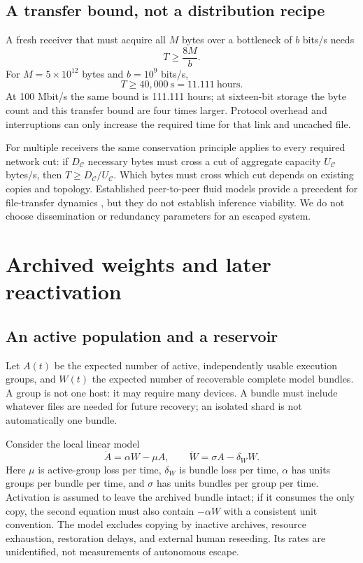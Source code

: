 \documentclass[11pt]{article}
\begin{document}
\subsection{A transfer bound, not a distribution recipe}
A fresh receiver that must acquire all $M$ bytes over a bottleneck of $b$ bits/s needs
\begin{equation}
T\ge\frac{8M}{b}.
\end{equation}
For $M=5\times10^{12}$ bytes and $b=10^9$ bits/s,
\begin{equation}
T\ge40{,}000\ \mathrm s=11.111\ \mathrm{hours}.
\end{equation}
At 100 Mbit/s the same bound is 111.111 hours; at sixteen-bit storage the byte count and this transfer bound are four times larger. Protocol overhead and interruptions can only increase the required time for that link and uncached file.

For multiple receivers the same conservation principle applies to every required network cut: if $D_{\mathcal C}$ necessary bytes must cross a cut of aggregate capacity $U_{\mathcal C}$ bytes/s, then $T\ge D_{\mathcal C}/U_{\mathcal C}$. Which bytes must cross which cut depends on existing copies and topology. Established peer-to-peer fluid models provide a precedent for file-transfer dynamics \citep{qiu}, but they do not establish inference viability. We do not choose dissemination or redundancy parameters for an escaped system.

\section{Archived weights and later reactivation}
\subsection{An active population and a reservoir}
Let $A(t)$ be the expected number of active, independently usable execution groups, and $W(t)$ the expected number of recoverable complete model bundles. A group is not one host: it may require many devices. A bundle must include whatever files are needed for future recovery; an isolated shard is not automatically one bundle.

Consider the local linear model
\begin{equation}\label{eq:reservoir}
\dot A=\alpha W-\mu A,\qquad\dot W=\sigma A-\delta_W W.
\end{equation}
Here $\mu$ is active-group loss per time, $\delta_W$ is bundle loss per time, $\alpha$ has units groups per bundle per time, and $\sigma$ has units bundles per group per time. Activation is assumed to leave the archived bundle intact; if it consumes the only copy, the second equation must also contain $-\alpha W$ with a consistent unit convention. The model excludes copying by inactive archives, resource exhaustion, restoration delays, and external human reseeding. Its rates are unidentified, not measurements of autonomous escape.
\end{document}
